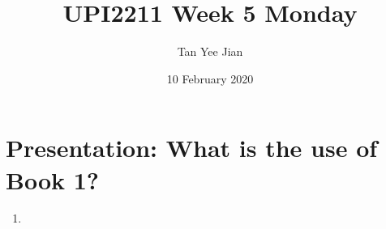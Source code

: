 \documentclass[12pt, a4paper]{article}
\title{UPI2211 Week 5 Monday}
\author{Tan Yee Jian}
\date{10 February 2020}
\begin{document}
  \maketitle
  \section{Presentation: What is the use of Book 1?}
  \begin{enumerate}
    \item{}
  \end{enumerate}
\end{document}
